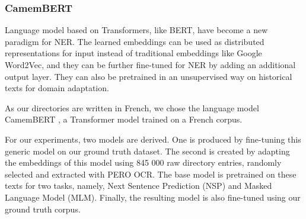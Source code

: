 \subsubsection{CamemBERT}
Language model based on Transformers, like BERT, have become a new paradigm for NER\cite{li2020}. 
The learned embeddings can be used as distributed representations for input instead of traditional embeddings like Google Word2Vec, and they can be further fine-tuned for NER by adding an additional output layer. 
They can also be pretrained in an unsupervised way on historical texts for domain adaptation.

As our directories are written in French, we chose the language model CamemBERT \cite{martin-etal-2020-camembert}, a Transformer model trained on a French corpus.

For our experiments, two models are derived. One is produced by fine-tuning this generic model on our ground truth dataset.
The second is created by adapting the embeddings of this model using 845 000 raw directory entries, randomly selected and extracted with PERO OCR. The base model is pretrained on these texts for two tasks, namely, Next Sentence Prediction (NSP) and Masked Language Model (MLM). Finally, the resulting model is also fine-tuned using our ground truth corpus.


